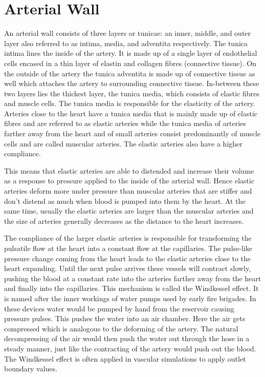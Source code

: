 \documentclass[a4paper, oneside]{discothesis}
\begin{document}
\section{Arterial Wall} \label{sec:aw}
An arterial wall consists of three layers or tunicae: an inner, middle, and outer layer also referred to as intima, media, and adventita respectively.
The tunica intima lines the inside of the artery. It is made up of a single layer of endothelial cells encased in a thin layer of elastin and collagen fibres (connective tissue). 
On the outside of the artery the tunica adventita is made up of connective tissue as well which attaches the artery to surrounding connective tissue.
In-between these two layers lies the thickest layer, the tunica media, which consists of elastic fibres and muscle cells. 
The tunica media is responsible for the elasticity of the artery.
Arteries close to the heart have a tunica media that is mainly made up of elastic fibres and are referred to as elastic arteries while the tunica media of arteries farther away from the heart and of small arteries consist predominantly of muscle cells and are called muscular arteries.
The elastic arteries also have a higher compliance.

This means that elastic arteries are able to distended and increase their volume as a response to pressure applied to the inside of the arterial wall.
Hence elastic arteries deform more under pressure than muscular arteries that are stiffer and don't distend as much when blood is pumped into them by the heart.
At the same time, usually the elastic arteries are larger than the muscular arteries and the size of arteries generally decreases as the distance to the heart increases.

The compliance of the larger elastic arteries is responsible for transforming the pulsatile flow at the heart into a constant flow at the capillaries.
The pulse-like pressure change coming from the heart leads to the elastic arteries close to the heart expanding.
Until the next pulse arrives these vessels will contract slowly, pushing the blood at a constant rate into the arteries farther away from the heart and finally into the capillaries.
This mechanism is called the Windkessel effect.
It is named after the inner workings of water pumps used by early fire brigades.
In these devices water would be pumped by hand from the reservoir causing pressure pulses.
This pushes the water into an air chamber.
Here the air gets compressed which is analogous to the deforming of the artery.
The natural decompressing of the air would then push the water out through the hose in a steady manner, just like the contracting of the artery would push out the blood.
The Windkessel effect is often applied in vascular simulations to apply outlet boundary values. \cite{köppl2023dimension}
\end{document}
